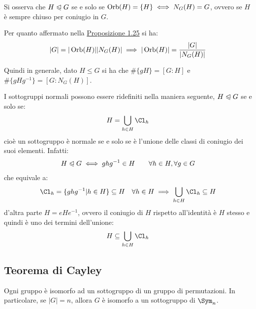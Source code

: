 \documentclass[11pt]{scrartcl}
\begin{document}
\begin{remark}
    Si osserva che $H \trianglelefteqslant G$ se e solo se $\operatorname{Orb}(H) = \{H\} \iff N_G(H) = G$, ovvero se $H$ è sempre chiuso per coniugio in $G$.
\end{remark}

Per quanto affermato nella \hyperref[p:1.25]{Proposizione 1.25} si ha:
    \[ |G| = |\operatorname{Orb}(H)||N_G(H)| \implies |\operatorname{Orb}(H)| = \frac{|G|}{|N_G(H)|}
    \]
\begin{remark}
    Quindi in generale, dato $H \leqslant G$ si ha che $\#\{gH\} = [G:H]$ e $\#\{gHg^{-1}\} = [G : N_G(H)]$.
\end{remark}

\begin{remark}
    I sottogruppi normali possono essere ridefiniti nella maniera seguente, $H \trianglelefteqslant G$ se e solo se:
        \[ H = \bigcup_{h \in H} \Cl_h
            \]
    cioè un sottogruppo è normale se e solo se è l'unione delle classi di coniugio dei suoi elementi. Infatti:
        \[ H \trianglelefteqslant G \iff ghg^{-1} \in H \qquad \forall h \in H, \forall g \in G
            \]
    che equivale a:
        \[ \Cl_h = \{ghg^{-1} | h \in H\} \subseteq H  \quad \forall h \in H \implies \bigcup_{h \in H} \Cl_h \subseteq H
            \]
    d'altra parte $H = eHe^{-1}$, ovvero il coniugio di $H$ rispetto all'identità è $H$ stesso e quindi è uno dei termini dell'unione:
        \[ H \subseteq \bigcup_{h \in H} \Cl_h
            \] 
    
\end{remark}

\newpage
\subsection{Teorema di Cayley}

\begin{theorem}
    \label{p:Cayley}
    Ogni gruppo è isomorfo ad un sottogruppo di un gruppo di permutazioni. In particolare, se $|G| = n$, allora 
    $G$ è isomorfo a un sottogruppo di $\Sym_n$.
\end{theorem}
\end{document}
